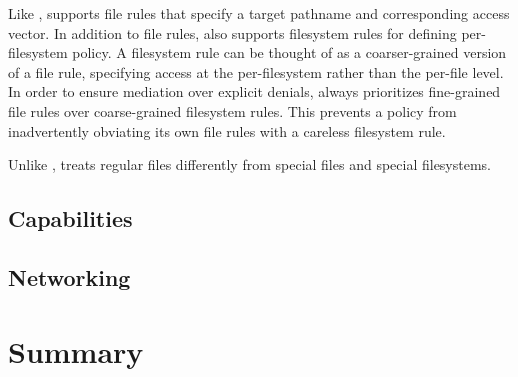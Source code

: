 Like \bpfbox{}, \bpfcontain{} supports file rules that specify a target pathname and
corresponding access vector. In addition to file rules, \bpfcontain{} also supports
filesystem rules for defining per-filesystem policy. A filesystem rule can be thought of
as a coarser-grained version of a file rule, specifying access at the per-filesystem
rather than the per-file level. In order to ensure mediation over explicit denials,
\bpfcontain{} always prioritizes fine-grained file rules over coarse-grained filesystem
rules.  This prevents a policy from inadvertently obviating its own file rules with
a careless filesystem rule.

Unlike \bpfbox{}, \bpfcontain{} treats regular files differently from special files and
special filesystems.

\subsection{Capabilities}

\subsubsection{\bpfbox{}}

\subsubsection{\bpfcontain{}}

\subsection{Networking}

\subsubsection{\bpfbox{}}

\subsubsection{\bpfcontain{}}

\subsection{}

\subsubsection{\bpfbox{}}

\subsubsection{\bpfcontain{}}



\section{Summary}%
\label{s:eval-summary}
